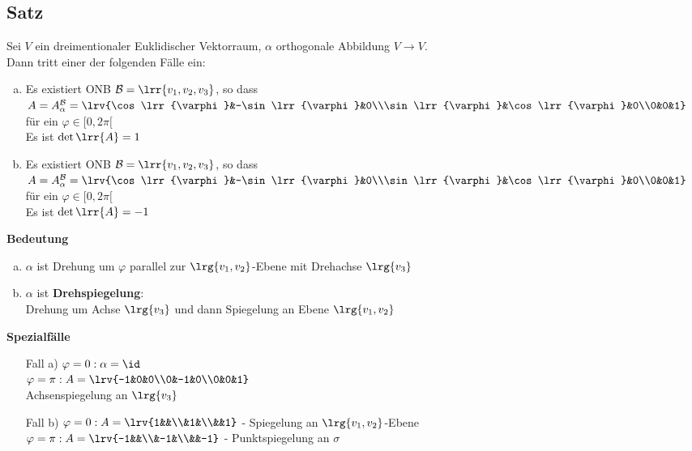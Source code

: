 \subsection{Satz}
	Sei $V$ ein dreimentionaler Euklidischer Vektorraum, $\alpha$ orthogonale Abbildung $V\rightarrow V$.\\
	Dann tritt einer der folgenden Fälle ein:
	\begin{enumerate}[a)]
		\item Es existiert ONB $\mathcal{B}=\lrr{v_1,v_2,v_3}$, so dass $A=A_{\alpha}^{\mathcal{B}}=\lrv{\cos\lrr{\varphi}&-\sin\lrr{\varphi}&0\\\sin\lrr{\varphi}&\cos\lrr{\varphi}&0\\0&0&1}$ für ein $\varphi\in [0,2\pi[$\\
			Es ist $\det\lrr{A}=1$
		\item Es existiert ONB $\mathcal{B}=\lrr{v_1,v_2,v_3}$, so dass $A=A_{\alpha}^{\mathcal{B}}=\lrv{\cos\lrr{\varphi}&-\sin\lrr{\varphi}&0\\\sin\lrr{\varphi}&\cos\lrr{\varphi}&0\\0&0&1}$ für ein $\varphi\in [0,2\pi[$\\
			Es ist $\det\lrr{A}=-1$
	\end{enumerate}
	\textbf{Bedeutung}
	\begin{enumerate}[a)]
		\item $\alpha$ ist Drehung um $\varphi$ parallel zur $\lrg{v_1,v_2}$-Ebene mit Drehachse $\lrg{v_3}$
			
		
		\item $\alpha$ ist \textbf{Drehspiegelung}:\\
			Drehung um Achse $\lrg{v_3}$ und dann Spiegelung an Ebene $\lrg{v_1,v_2}$
	\end{enumerate}
	\textbf{Spezialfälle}
	\begin{enumerate}[a)]
		\item[Fall a)] $\varphi=0 : \alpha=\id$\\
			$\varphi=\pi: A=\lrv{-1&0&0\\0&-1&0\\0&0&1}$\\
			Achsenspiegelung an $\lrg{v_3}$
		\item[Fall b)] $\varphi=0 : A=\lrv{1&&\\&1&\\&&1}$ - Spiegelung an $\lrg{v_1,v_2}$-Ebene\\
			$\varphi=\pi : A=\lrv{-1&&\\&-1&\\&&-1}$ - Punktspiegelung an $\sigma$
	\end{enumerate}

